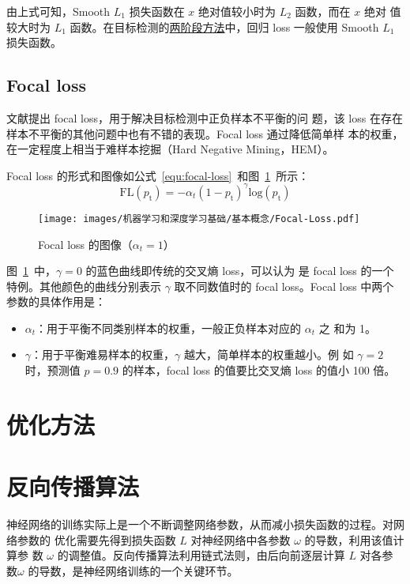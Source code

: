 由上式可知，Smooth $L_1$ 损失函数在 $x$ 绝对值较小时为 $L_2$ 函数，而在 $x$ 绝对
值较大时为 $L_1$ 函数。在目标检测的\hyperref[sec:R-CNN]{两阶段方法}中，回归 loss
一般使用 Smooth $L_1$ 损失函数。

\subsection{Focal loss}

文献提出 focal loss，用于解决目标检测中正负样本不平衡的问
题，该 loss 在存在样本不平衡的其他问题中也有不错的表现。Focal loss 通过降低简单样
本的权重，在一定程度上相当于难样本挖掘（Hard Negative Mining，HEM）。

Focal loss 的形式和图像如公式~\ref{equ:focal-loss}~和图~\ref{fig:focal-loss}~所示：
\begin{equation}
  \label{equ:focal-loss}
  \mathrm{FL}(p_{\mathrm{t}}) = - \alpha_t (1-p_{\mathrm{t}})^{\gamma} \mathrm{log}(p_{\mathrm{t}})
\end{equation}

\begin{figure}[ht]
  \centering
  \texttt{[image: images/机器学习和深度学习基础/基本概念/Focal-Loss.pdf]}
  \caption{Focal loss 的图像（$\alpha_t = 1$）}
  \label{fig:focal-loss}
\end{figure}

图~\ref{fig:focal-loss}~中，$\gamma = 0$ 的蓝色曲线即传统的交叉熵 loss，可以认为
是 focal loss 的一个特例。其他颜色的曲线分别表示 $\gamma$ 取不同数值时的 focal
loss。Focal loss 中两个参数的具体作用是：

\begin{itemize}
  \item $\alpha_t$：用于平衡不同类别样本的权重，一般正负样本对应的 $\alpha_t$ 之
    和为 1。
  \item $\gamma$：用于平衡难易样本的权重，$\gamma$ 越大，简单样本的权重越小。例
    如 $\gamma = 2$ 时，预测值 $p = 0.9$ 的样本，focal loss 的值要比交叉熵 loss
    的值小 100 倍。
\end{itemize}

\section{优化方法}
\label{sec:opt}

\section{反向传播算法}
神经网络的训练实际上是一个不断调整网络参数，从而减小损失函数的过程。对网络参数的
优化需要先得到损失函数 $L$ 对神经网络中各参数 $\omega$ 的导数，利用该值计算参
数 $\omega$ 的调整值。反向传播算法利用链式法则，由后向前逐层计算 $L$ 对各参
数$\omega$ 的导数，是神经网络训练的一个关键环节。

